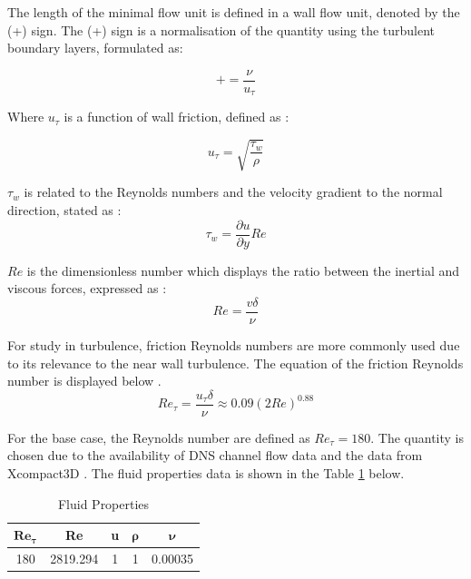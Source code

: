 The length of the minimal flow unit is defined in a wall flow unit, denoted by the (+) sign. The (+) sign is a normalisation of the quantity using the turbulent boundary layers, formulated as:

\begin{equation}
	+ = \frac{\nu}{u_\tau}
\end{equation}

Where $u_\tau$ is a function of wall friction, defined as \cite{Pope2000}:

\begin{equation}
	u_\tau = \sqrt{\frac{\tau_w}{\rho}}
\end{equation}

$\tau_w$ is related to the Reynolds numbers and the velocity gradient to the normal direction, stated as \cite{Daniel2017}:
\begin{equation}
	\tau_{w} = \frac{\partial u}{\partial y} Re
\end{equation}

$Re$ is the dimensionless number which displays the ratio between the inertial and viscous forces, expressed as \cite{NASA_Re}:
\begin{equation}
	Re = \frac{v \delta}{\nu}
\end{equation}

For study in turbulence, friction Reynolds numbers are more commonly used due to its relevance to the near wall turbulence. The equation of the friction Reynolds number is displayed below \cite{Pope2000}.
\begin{equation}
	Re_\tau = \frac{u_\tau \delta}{\nu} \approx 0.09 (2Re)^{0.88} 
\end{equation}

For the base case, the Reynolds number are defined as $Re_\tau = 180$. The quantity is chosen due to the availability of DNS channel flow data \cite{Lee2015} and the data from Xcompact3D \cite{Bartholomew2020}. The fluid properties data is shown in the Table \ref{tab:fluprop} below.

\begin{table}[ht]
	\caption{Fluid Properties}
	\label{tab:fluprop}
	\centering
	\begin{tabular}{ccccc}
		\hline
		{$\boldsymbol{Re_\tau}$} & \textbf{Re} & \textbf{u} & {$\boldsymbol{\rho}$} & {$\boldsymbol{\nu}$} \\ \hline
		180               & 2819.294    & 1          & 1               & 0.00035        \\ \hline
	\end{tabular}
\end{table}
 



